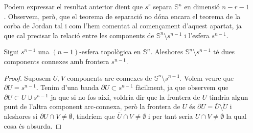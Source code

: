 \documentclass[../main.tex]{subfiles}
\begin{document}
Podem expressar el resultat anterior dient que $s^r$ separa $\mathbb{S}^n$ en dimensió $n-r-1$. Observem, però, que el teorema de separació no dóna encara el teorema de la corba de Jordan tal i com l'hem comentat al començament d'aquest apartat, ja que cal precisar la relació entre les components de $\mathbb{S}^n\setminus s^{n-1}$ i l'esfera $s^{n-1}$.

\begin{ter}
\label{ter:jordanbrouwer} Sigui $s^{n-1}$ una $(n-1)$-esfera topològica en $\mathbb{S}^n$. Aleshores $\mathbb{S}^n\setminus s^{n-1}$ té dues components connexes amb frontera $s^{n-1}$.
\end{ter}
\begin{proof}
Suposem $U,V$ components arc-connexes de $\mathbb{S}^n\setminus s^{n-1}$. Volem veure que $\partial U = s^{n-1}$. Tenim d'una banda $\partial U\subset s^{n-1}$ fàcilment, ja que observem que $\partial U\subset U\cup s^{n-1}$ ja que si no fos així, voldria dir que la frontera de $U$ tindria algun punt de l'altra component arc-connexa, però la frontera de $U$ és $\partial U= \overline{U}\setminus\mathring{U}$ i aleshores si $\partial U\cap V\not=\emptyset$, tindríem que $\overline{U}\cap V\not=\emptyset$ i per tant seria $U\cap V\not=\emptyset$ la qual cosa és absurda.


\end{proof}
\end{document}

